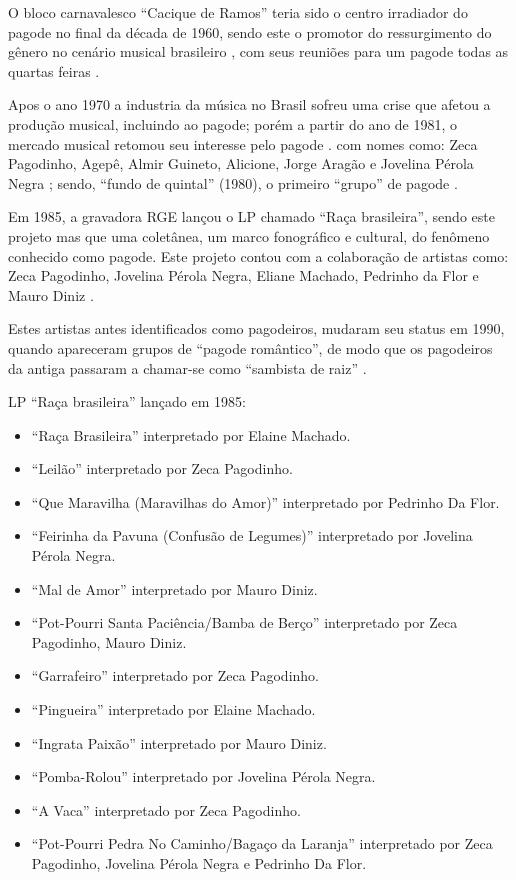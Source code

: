 O bloco carnavalesco ``Cacique de Ramos'' teria sido o centro irradiador do pagode no final da década de 1960,
sendo este o promotor do ressurgimento do gênero no cenário musical brasileiro \cite{sedano2018bezerra},
com seus reuniões  para um pagode todas as quartas feiras  \cite[pp. 210]{diniz2006almanaque}.

Apos o ano 1970 a industria da música no Brasil sofreu uma crise que afetou a produção musical, 
incluindo ao pagode;
porém a partir do ano de 1981, o mercado musical retomou seu interesse pelo pagode \cite{sedano2018bezerra}.
com nomes como: Zeca Pagodinho, Agepê, Almir Guineto, Alicione, 
Jorge Aragão e Jovelina Pérola Negra \cite[pp. 130]{perna2002samba} \cite{sedano2018bezerra};
sendo, ``fundo de quintal'' (1980), o primeiro ``grupo'' de pagode \cite[pp. 130]{perna2002samba} \cite{fundodequintal}.

Em 1985, a gravadora RGE lançou o LP chamado  ``Raça brasileira'', 
sendo este projeto mas que uma coletânea, um marco fonográfico e cultural,
do fenômeno conhecido como pagode. Este projeto contou com a colaboração de artistas como:
Zeca Pagodinho, 
Jovelina Pérola Negra, 
Eliane Machado,
Pedrinho da Flor e
Mauro Diniz \cite[pp. 211]{diniz2006almanaque}.

Estes artistas antes identificados como pagodeiros, mudaram seu status em 1990, 
 quando apareceram grupos de ``pagode romântico'', 
de modo que os pagodeiros da antiga passaram a chamar-se como ``sambista de raiz''  \cite{sedano2018bezerra}. 

\begin{example} LP ``Raça brasileira'' lançado em 1985:

\begin{itemize}
\item ``Raça Brasileira'' interpretado por Elaine Machado.
\item ``Leilão'' interpretado por Zeca Pagodinho.
\item ``Que Maravilha (Maravilhas do Amor)'' interpretado por Pedrinho Da Flor.
\item ``Feirinha da Pavuna (Confusão de Legumes)'' interpretado por Jovelina Pérola Negra.
\item ``Mal de Amor''  interpretado por  Mauro Diniz.
\item ``Pot-Pourri Santa Paciência/Bamba de Berço'' interpretado por Zeca Pagodinho, Mauro Diniz.
\item ``Garrafeiro'' interpretado por Zeca Pagodinho.
\item ``Pingueira'' interpretado por Elaine Machado.
\item ``Ingrata Paixão'' interpretado por Mauro Diniz.
\item ``Pomba-Rolou'' interpretado por  Jovelina Pérola Negra.
\item ``A Vaca'' interpretado por Zeca Pagodinho.
\item ``Pot-Pourri Pedra No Caminho/Bagaço da Laranja'' interpretado por Zeca Pagodinho, Jovelina Pérola Negra e Pedrinho Da Flor.
\end{itemize}
\end{example}

